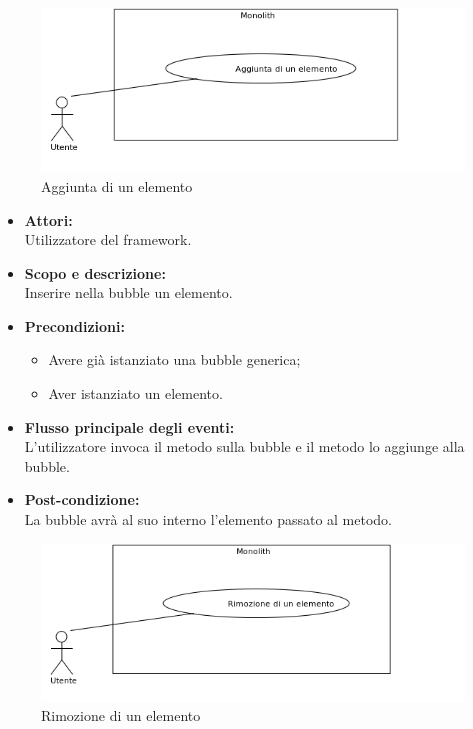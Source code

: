 \pagebreak


\begin{figure}[H]
	\centering
	\includegraphics[width=15cm]{../../documenti/AnalisiDeiRequisiti/Diagrammi_img/uc1_04.png}
	\caption{\UCFCaption{} Aggiunta di un elemento}
\end{figure}

\begin{itemize}
	\item \textbf{Attori:}
	\\Utilizzatore del framework.
	\item \textbf{Scopo e descrizione:} 
	\\Inserire nella bubble un elemento.
	\item \textbf{Precondizioni:}
	\begin{itemize}
		\item Avere già istanziato una bubble generica;
		\item Aver istanziato un elemento.
	\end{itemize}
	\item \textbf{Flusso principale degli eventi:}
	\\L'utilizzatore invoca il metodo sulla bubble e il metodo lo aggiunge alla bubble.
	\item \textbf{Post-condizione:}
	\\La bubble avrà al suo interno l'elemento passato al metodo.
\end{itemize}

\pagebreak


\begin{figure}[H]
	\centering
	\includegraphics[width=15cm]{../../documenti/AnalisiDeiRequisiti/Diagrammi_img/uc1_03.png}
	\caption{\UCCCaption{} Rimozione di un elemento}
\end{figure}


